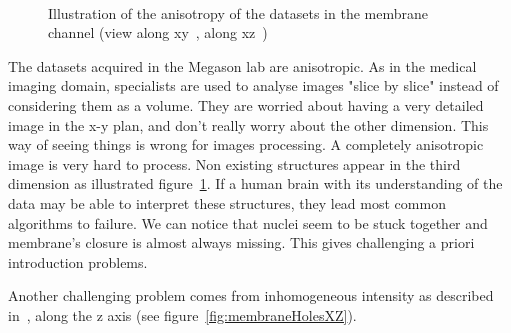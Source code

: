 \begin{figure}[htb]
  \centering
  \captionsetup[subfloat]{labelformat=empty}
  \\
\caption{%
Illustration of the anisotropy of the datasets in the membrane channel (view along xy~, along xz~)}
\label{fig:anisotropy}
\end{figure}
The datasets acquired in the Megason lab are anisotropic. As in the medical imaging domain, specialists are used to analyse images "slice by slice"
instead of considering them as a volume. They are worried about having a very detailed image in the x-y plan, and don't really worry about the other dimension.
This way of seeing things is wrong for images processing. A completely anisotropic image is very hard to process.
Non existing structures appear in the third dimension as illustrated figure~\ref{fig:anisotropy}.
If a human brain with its understanding of the data may be able to interpret these structures, they lead most common algorithms to failure.
We can notice that nuclei seem to be stuck together and membrane's closure is almost always missing. This gives challenging a priori introduction problems.

Another challenging problem comes from inhomogeneous intensity as described in~\cite{umesh2001efficient}, along the z axis (see figure~\ref{fig:membraneHolesXZ}).


